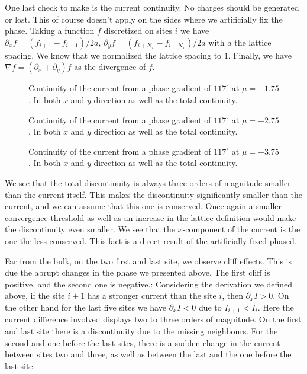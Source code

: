 \documentclass[..\main.tex]{subfile}
\begin{document}
One last check to make is the current continuity. No charges should be generated or lost. This of course doesn't apply on
the sides where we artificially fix the phase. Taking a function $f$ discretized on sites $i$ we have $\partial_x f = (f_{i+1} - f_{i-1} )/2a$,
$\partial_y f = (f_{i+N_x} - f_{i-N_x} )/2a$ with
$a$ the lattice spacing. We know that we normalized the lattice spacing to $1$. Finally, we have $\nabla f = (\partial_x + \partial_y) f$ as the divergence
of $f$.
\begin{figure}[H]
    
    \caption{Continuity of the current from a phase gradient of $117^{\circ}$ at $\mu = -1.75$. In both $x$ and $y$ direction as
    well as the total continuity.}
\end{figure}
\begin{figure}[H]
    
    \caption{Continuity of the current from a phase gradient of $117^{\circ}$ at $\mu = -2.75$. In both $x$ and $y$ direction as
    well as the total continuity.}
\end{figure}
\begin{figure}[H]
    
    \caption{Continuity of the current from a phase gradient of $117^{\circ}$ at $\mu = -3.75$. In both $x$ and $y$ direction as
    well as the total continuity.}
\end{figure}
We see that the total discontinuity is always three orders of magnitude smaller than the current itself. This makes the discontinuity
significantly smaller than the current, and we can assume that this one is conserved. Once again a smaller convergence threshold
as well as an increase in the lattice definition would make the discontinuity even smaller.
We see that the $x$-component of the current is the one the less conserved. This fact is a direct result of the artificially fixed phased.

Far from the bulk, on the two first and last site, we observe cliff effects. This is due the abrupt changes in the phase we presented above.
The first cliff is positive, and the second one is negative.:
Considering the derivation we defined above, if the site $i+1$ has a stronger current than the site $i$, then $\partial_x I > 0$.
On the other hand for the last five sites we have $\partial_x I <0$ due to $I_{i+1}< I_i$. Here the current difference involved displays two to three orders of magnitude.
On the first and last site there is a discontinuity due to the missing neighbours. For the second and one before the last sites, there is a sudden change in the current
between sites two and three, as well as between the last and the one before the last site.\\
\end{document}
